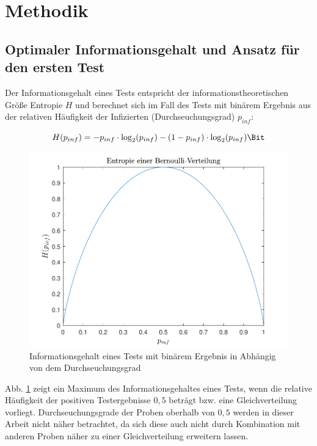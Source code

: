 \documentclass[fleqn,10pt]{wlscirep}
\begin{document}
\section*{Methodik}

\subsection{Optimaler Informationsgehalt und Ansatz für den ersten Test}
Der Informationsgehalt eines Tests entspricht der informationstheoretischen Größe \glqq Entropie\grqq{} $H$ \cite{Shannon} und berechnet sich im Fall des Tests mit binärem Ergebnis aus der relativen Häufigkeit der Infizierten (Durchseuchungsgrad) $p_{inf}$:

\begin{equation}
H(p_{inf}) = -p_{inf} \cdot \log_2(p_{inf})-(1-p_{inf}) \cdot \log_2(p_{inf}) \si{\Bit}
\end{equation}

\begin{figure}[ht]
	\centering
	\includegraphics[]{pics/Bin_Entropie.pdf}
	\caption{Informationsgehalt eines Tests mit binärem Ergebnis in Abhängig von dem Durchseuchungsgrad}
	\label{fig:bin_entropie}
\end{figure}

Abb. \ref{fig:bin_entropie} zeigt ein Maximum des Informationsgehaltes eines Tests, wenn die relative Häufigkeit der positiven Testergebnisse $0,5$ beträgt bzw. eine Gleichverteilung vorliegt. Durchseuchungsgrade der Proben oberhalb von $0,5$ werden in dieser Arbeit nicht näher betrachtet, da sich diese auch nicht durch Kombination mit anderen Proben näher zu einer Gleichverteilung erweitern lassen. 
\end{document}
